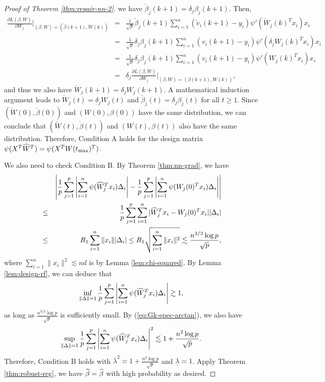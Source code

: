 \begin{proof}[Proof of Theorem \ref{thm:repair-nn-2}]
we have $\check{\beta}_j(k+1)=\delta_j\beta_j(k+1)$.
Then,
\begin{eqnarray*}
\frac{\partial L(\beta,W)}{\partial W_j}|_{(\beta,W)=(\check{\beta}(k+1),\check{W}(k))} &=& \frac{1}{\sqrt{p}}\check{\beta}_j(k+1)\sum_{i=1}^n(\check{v}_i(k+1)-y_i)\psi'(\check{W}_j(k)^Tx_i)x_i \\
&=& \frac{1}{\sqrt{p}}\delta_j{\beta}_j(k+1)\sum_{i=1}^n({v}_i(k+1)-y_i)\psi'(\delta_j{W}_j(k)^Tx_i)x_i \\
&=& \frac{1}{\sqrt{p}}\delta_j{\beta}_j(k+1)\sum_{i=1}^n({v}_i(k+1)-y_i)\psi'({W}_j(k)^Tx_i)x_i \\
&=& \delta_j\frac{\partial L(\beta,W)}{\partial W_j}|_{(\beta,W)=({\beta}(k+1),{W}(k))},
\end{eqnarray*}
and thus we also have $\check{W}_j(k+1)=\delta_jW_j(k+1)$. A mathematical induction argument leads to $\check{W}_j(t)=\delta_jW_j(t)$ and $\check{\beta}_j(t)=\delta_j\beta_j(t)$ for all $t\geq 1$. Since $(\check{W}(0),\check{\beta}(0))$ and $(W(0),\beta(0))$ have the same distribution, we can conclude that $(\check{W}(t),\check{\beta}(t))$ and $(W(t),\beta(t))$ also have the same distribution. Therefore, Condition A holds for the design matrix $\psi(X^T\widehat{W}^T)=\psi(X^TW(t_{\max})^T)$.

We also need to check Condition B. By Theorem \ref{thm:nn-grad}, we have
\begin{eqnarray*}
&& \left|\frac{1}{p}\sum_{j=1}^p\left|\sum_{i=1}^n\psi(\wh{W}_j^Tx_i)\Delta_i\right| - \frac{1}{p}\sum_{j=1}^p\left|\sum_{i=1}^n\psi(W_j(0)^Tx_i)\Delta_i\right|\right| \\
&\leq& \frac{1}{p}\sum_{j=1}^p\sum_{i=1}^n|\wh{W}_j^Tx_i-W_j(0)^Tx_i||\Delta_i| \\
&\leq& R_1\sum_{i=1}^n\|x_i\||\Delta_i| \leq R_1\sqrt{\sum_{i=1}^n\|x_i\|^2} \lesssim \frac{n^{3/2}\log p}{\sqrt{p}},
\end{eqnarray*}
where $\sum_{i=1}^n\|x_i\|^2\lesssim nd$ is by Lemma \ref{lem:chi-squared}. By Lemma \ref{lem:design-rf}, we can deduce that
$$\inf_{\|\Delta\|=1}\frac{1}{p}\sum_{j=1}^p\left|\sum_{i=1}^n\psi(\widehat{W}_j^Tx_i)\Delta_i\right|\gtrsim 1,$$
as long as $\frac{n^{3/2}\log p}{\sqrt{p}}$ is sufficiently small. By (\ref{eq:Gk-spec-arctan}), we also have
$$\sup_{\|\Delta\|=1}\frac{1}{p}\sum_{j=1}^p\left|\sum_{i=1}^n\psi(\widehat{W}_j^Tx_i)\Delta_i\right|^2\lesssim 1+\frac{n^2\log p}{\sqrt{p}}.$$
Therefore, Condition B holds with $\overline{\lambda}^2\asymp 1+\frac{n^2\log p}{\sqrt{p}}$ and $\underline{\lambda}\asymp 1$. Apply Theorem \ref{thm:robust-reg}, we have $\widetilde{\beta}=\widehat{\beta}$ with high probability as desired.
\end{proof}
